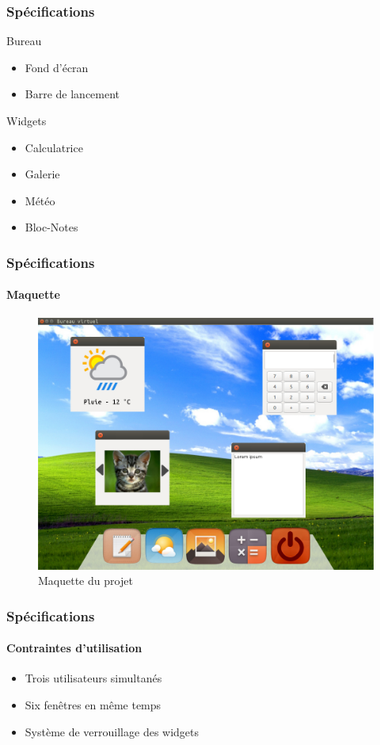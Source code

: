 \begin{frame}
	\frametitle{Spécifications}
	\begin{block}{Bureau}
		\begin{itemize}
			\item Fond d'écran
			\item Barre de lancement
		\end{itemize}
	\end{block}
	\begin{block}{Widgets}
		\begin{itemize}
			\item Calculatrice
			\item Galerie
			\item Météo
			\item Bloc-Notes
		\end{itemize}
	\end{block}
\end{frame}

\begin{frame}
	\frametitle{Spécifications}
		\framesubtitle{Maquette}
			\begin{figure}
				\includegraphics[scale=0.2]{resources/maquette.jpg}
				\caption{Maquette du projet}
			\end{figure}
\end{frame}

\begin{frame}
	\frametitle{Spécifications}
		\framesubtitle{Contraintes d'utilisation}
			\begin{itemize}
				\item Trois utilisateurs simultanés
				\item Six fenêtres en même temps
				\item Système de verrouillage des widgets
			\end{itemize}
\end{frame}